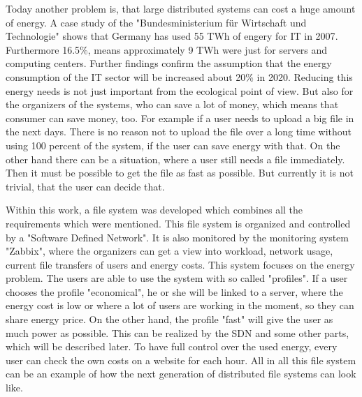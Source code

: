 Today another problem is, that large distributed systems can cost a huge amount of energy. A case study of the "Bundesministerium f\"ur Wirtschaft und Technologie" shows that Germany has used 55 TWh of engery for IT in 2007\cite{bmwi}. Furthermore 16.5\%, means approximately 9 TWh were just for servers and computing centers. Further findings confirm the assumption that the energy consumption of the IT sector will be increased about 20\% in 2020. Reducing this energy needs is not just important from the ecological point of view. But also for the organizers of the systems, who can save a lot of money, which means that consumer can save money, too. For example if a user needs to upload a big file in the next days. There is no reason not to upload the file over a long time without using 100 percent of the system, if the user can save energy with that. On the other hand there can be a situation, where a user still needs a file immediately. Then it must be possible to get the file as fast as possible. But currently it is not trivial, that the user can decide that.  

Within this work, a file system was developed which combines all the requirements which were mentioned. This file system is organized and controlled by a "Software Defined Network". It is also monitored by the monitoring system "Zabbix", where the organizers can get a view into workload, network usage, current file transfers of users and energy costs. This system focuses on the energy problem. The users are able to use the system with so called "profiles". If a user chooses the profile "economical", he or she will be linked to a server, where the energy cost is low or where a lot of users are working in the moment, so they can share energy price. On the other hand, the profile "fast" will give the user as much power as possible. This can be realized by the SDN and some other parts, which will be described later. To have full control over the used energy, every user can check the own costs on a website for each hour. All in all this file system can be an example of how the next generation of distributed file systems can look like.               